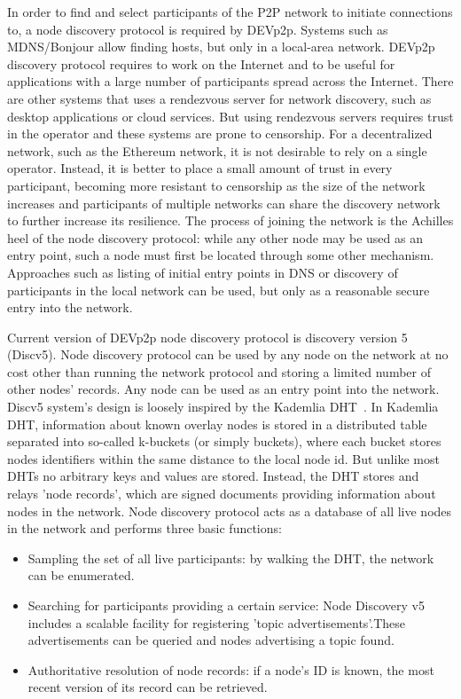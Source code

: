 In order to find and select participants of the P2P network to initiate connections to,  a node discovery protocol is required by DEVp2p.
Systems such as MDNS/Bonjour allow finding hosts,  but only in  a local-area network.  DEVp2p discovery protocol requires to work on the Internet and to be useful for applications with a large number of participants spread across the Internet.
There are other systems that uses a rendezvous server for network discovery,  such as desktop applications or cloud services. 
But using rendezvous servers requires trust in the operator and these systems are prone to censorship. 
For a decentralized network,  such as the Ethereum network,  it is not desirable to rely on a single operator.  
Instead,  it is better to place a small amount of trust in every participant, becoming more resistant to censorship as the size of the network increases and participants of multiple networks can share the discovery network to further increase its resilience.
The process of joining the network is the Achilles heel of the node discovery protocol: while any other node may be used as an entry point,  such a node must first be located through some other mechanism.  
Approaches such as listing of initial entry points in DNS or discovery of participants in the local network can be used,  but only as a reasonable secure entry into the network.

Current version of DEVp2p node discovery protocol is discovery version 5 (Discv5).
Node discovery protocol can be used by any node on the network  at no cost other than running the network protocol and storing a limited number of other nodes' records. 
Any node can be used as an entry point into the network.
Discv5 system's design is loosely inspired by the Kademlia DHT~\cite{}.
In Kademlia DHT,  information about known overlay nodes is stored in
a distributed table separated into so-called k-buckets (or simply buckets),  where each bucket stores nodes identifiers within the same distance to the local node id.
But unlike most DHTs no arbitrary keys and values are stored. 
Instead, the DHT stores and relays 'node records', which are signed documents providing information about nodes in the network. 
Node discovery protocol acts as a database of all live nodes in the network and performs three basic functions:

\begin{itemize}
 \item Sampling the set of all live participants: by walking the DHT,  the network can be enumerated.
 \item Searching for participants providing a certain service: Node Discovery v5 includes a scalable facility for registering 'topic advertisements'.These advertisements can be queried and nodes advertising a topic found.
 \item Authoritative resolution of node records: if a node's ID is known, the most recent version of its record can be retrieved.
\end{itemize}

